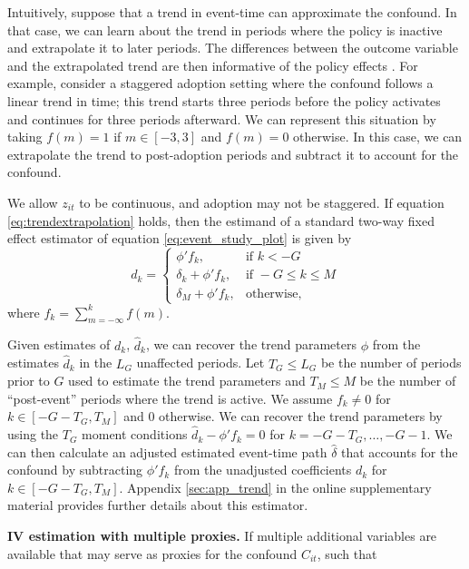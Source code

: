 \documentclass[12pt]{article}
\begin{document}
Intuitively, suppose that a trend in event-time can approximate the confound.
In that case, we can learn about the trend in periods where the policy is inactive and extrapolate it to later periods.
The differences between the outcome variable and the extrapolated trend are then informative of the policy effects \citep{dobkin2018economic}.
For example, consider a staggered adoption setting where the confound follows a linear trend in time; this trend starts three periods before the policy activates and continues for three periods afterward.
We can represent this situation by taking $f(m) = 1$ if $m \in \left[-3,3\right]$ and $f(m)=0$ otherwise. In this case, we can extrapolate the trend to post-adoption periods and subtract it to account for the confound.

We allow $z_{it}$ to be continuous, and adoption may not be staggered.
If equation \eqref{eq:trendextrapolation} holds, then the estimand of a standard two-way fixed effect estimator of equation \eqref{eq:event_study_plot} is given by
\begin{equation}\label{eq:trendcases}
d_k =
\begin{cases}
\phi' f_k, & \mbox{if } k < -G \\
\delta_k + \phi' f_k, & \mbox{if } -G \leq k \leq M \\
\delta_M + \phi'f_k, & \mbox{otherwise},
\end{cases}
\end{equation}
where $f_k = \sum_{m = -\infty}^{k} f(m)$.

Given estimates of $d_k$, $\widehat{d}_k$, we can recover the trend parameters $\phi$ from the estimates $\widehat{d}_k$ in the $L_G$ unaffected periods.
Let $T_G \leq L_G$ be the number of periods prior to $G$ used to estimate the trend parameters and $T_M \leq M$ be the number of ``post-event'' periods where the trend is active.
We assume $f_k \neq 0$ for $k \in \left[-G-T_G,T_M \right]$ and $0$ otherwise.
We can recover the trend parameters by using the $T_G$ moment conditions $\widehat{d}_k - \phi' f_k = 0$ for $k = -G - T_G,\ldots,-G-1$.
We can then calculate an adjusted estimated event-time path $\widehat{\delta}$ that accounts for the confound by subtracting $\phi' f_k$ from the unadjusted coefficients $d_k$ for $k \in \left[-G-T_G,T_M\right]$.
Appendix \ref{sec:app_trend} in the online supplementary material provides further details about this estimator.

\noindent \textbf{IV estimation with multiple proxies.}
If multiple additional variables are available that may serve as proxies for the confound $C_{it}$, such that
\end{document}
